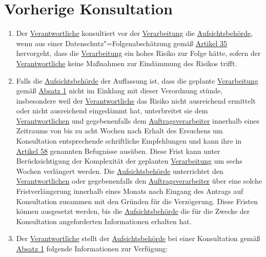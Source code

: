 \chapter{Vorherige Konsultation}
\label{ch:36}

\begin{enumerate}

  \item Der \hyperref[itm:04-7]{Verantwortliche} konsultiert vor der \hyperref[itm:04-2]{Verarbeitung} die \hyperref
   [itm:04-21]{Aufsichtsbehörde}, wenn aus einer Datenschutz"=Folgenabschätzung gemäß \hyperref[ch:35]{Artikel 35}
   hervorgeht, dass die \hyperref[itm:04-2]{Verarbeitung} ein hohes Risiko zur Folge hätte, sofern der \hyperref
   [itm:04-7]{Verantwortliche} keine Maßnahmen zur Eindämmung des Risikos trifft.%
  \label{itm:36-1}

  \item Falls die \hyperref[itm:04-21]{Aufsichtsbehörde} der Auffassung ist, dass die geplante \hyperref[itm:04-2]
   {Verarbeitung} gemäß \hyperref[itm:36-1]{Absatz 1} nicht im Einklang mit dieser Verordnung stünde, insbesondere weil
   der \hyperref[itm:04-7]{Verantwortliche} das Risiko nicht ausreichend ermittelt oder nicht ausreichend eingedämmt
   hat, unterbreitet sie dem \hyperref[itm:04-7]{Verantwortlichen} und gegebenenfalls dem \hyperref[itm:04-8]
   {Auftragsverarbeiter} innerhalb eines Zeitraums von bis zu acht Wochen nach Erhalt des Ersuchens um Konsultation
   entsprechende schriftliche Empfehlungen und kann ihre in \hyperref[ch:58]{Artikel 58} genannten Befugnisse ausüben.
   Diese Frist kann unter Berücksichtigung der Komplexität der geplanten \hyperref[itm:04-2]{Verarbeitung} um sechs
   Wochen verlängert werden. Die \hyperref[itm:04-21]{Aufsichtsbehörde} unterrichtet den \hyperref[itm:04-7]
   {Verantwortlichen} oder gegebenenfalls den
   \hyperref[itm:04-8]{Auftragsverarbeiter} über eine solche Fristverlängerung innerhalb eines Monats nach Eingang des
    Antrags auf Konsultation zusammen mit den Gründen für die Verzögerung. Diese Fristen können ausgesetzt werden, bis
    die
   \hyperref[itm:04-21]{Aufsichtsbehörde} die für die Zwecke der Konsultation angeforderten Informationen erhalten hat.%
  \label{itm:36-2}

  \item Der \hyperref[itm:04-7]{Verantwortliche} stellt der \hyperref[itm:04-21]{Aufsichtsbehörde} bei einer
   Konsultation gemäß \hyperref[itm:36-1]{Absatz 1} folgende Informationen zur Verfügung:%
  \label{itm:36-3}


\end{enumerate}
